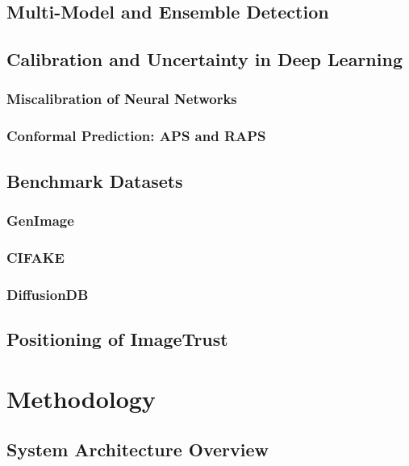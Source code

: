 \section{Multi-Model and Ensemble Detection}\label{sec:ensemble}

\section{Calibration and Uncertainty in Deep Learning}\label{sec:calib-related}
\subsection{Miscalibration of Neural Networks}
\subsection{Conformal Prediction: APS and RAPS}

\section{Benchmark Datasets}\label{sec:datasets-related}
\subsection{GenImage}
\subsection{CIFAKE}
\subsection{DiffusionDB}

\section{Positioning of ImageTrust}\label{sec:positioning}



\chapter{Methodology}\label{chap:methodology}

\section{System Architecture Overview}\label{sec:architecture}

